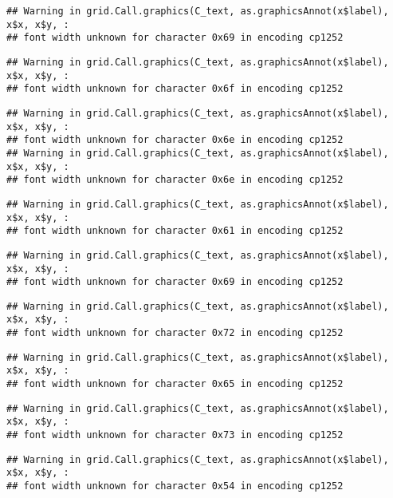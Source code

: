 \documentclass[
]{article}
\begin{document}
\begin{verbatim}
## Warning in grid.Call.graphics(C_text, as.graphicsAnnot(x$label), x$x, x$y, :
## font width unknown for character 0x69 in encoding cp1252
\end{verbatim}

\begin{verbatim}
## Warning in grid.Call.graphics(C_text, as.graphicsAnnot(x$label), x$x, x$y, :
## font width unknown for character 0x6f in encoding cp1252
\end{verbatim}

\begin{verbatim}
## Warning in grid.Call.graphics(C_text, as.graphicsAnnot(x$label), x$x, x$y, :
## font width unknown for character 0x6e in encoding cp1252
## Warning in grid.Call.graphics(C_text, as.graphicsAnnot(x$label), x$x, x$y, :
## font width unknown for character 0x6e in encoding cp1252
\end{verbatim}

\begin{verbatim}
## Warning in grid.Call.graphics(C_text, as.graphicsAnnot(x$label), x$x, x$y, :
## font width unknown for character 0x61 in encoding cp1252
\end{verbatim}

\begin{verbatim}
## Warning in grid.Call.graphics(C_text, as.graphicsAnnot(x$label), x$x, x$y, :
## font width unknown for character 0x69 in encoding cp1252
\end{verbatim}

\begin{verbatim}
## Warning in grid.Call.graphics(C_text, as.graphicsAnnot(x$label), x$x, x$y, :
## font width unknown for character 0x72 in encoding cp1252
\end{verbatim}

\begin{verbatim}
## Warning in grid.Call.graphics(C_text, as.graphicsAnnot(x$label), x$x, x$y, :
## font width unknown for character 0x65 in encoding cp1252
\end{verbatim}

\begin{verbatim}
## Warning in grid.Call.graphics(C_text, as.graphicsAnnot(x$label), x$x, x$y, :
## font width unknown for character 0x73 in encoding cp1252
\end{verbatim}

\begin{verbatim}
## Warning in grid.Call.graphics(C_text, as.graphicsAnnot(x$label), x$x, x$y, :
## font width unknown for character 0x54 in encoding cp1252
\end{verbatim}
\end{document}
